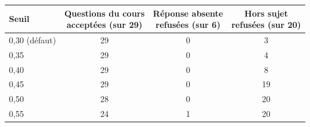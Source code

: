 \begin{tabular}{@{}lccc@{}}
\toprule
Seuil & \makecell{Questions du cours\\acceptées (sur 29)} & \makecell{Réponse absente\\refusées (sur 6)} & \makecell{Hors sujet\\refusées (sur 20)} \\
\midrule
0{,}30 (défaut) & 29 & 0 & 3 \\
0{,}35 & 29 & 0 & 4 \\
0{,}40 & 29 & 0 & 8 \\
0{,}45 & 29 & 0 & 19 \\
0{,}50 & 28 & 0 & 20 \\
0{,}55 & 24 & 1 & 20 \\
\bottomrule
\end{tabular}
